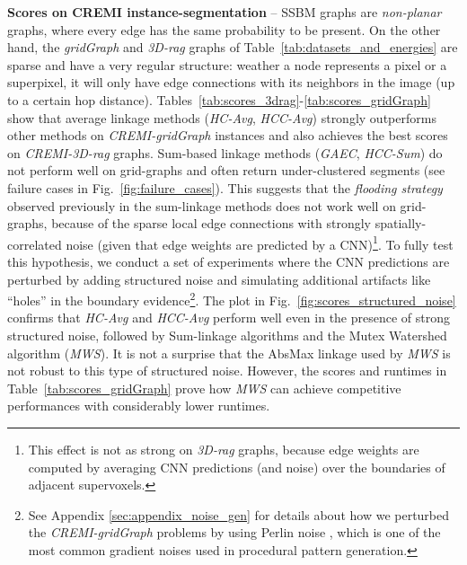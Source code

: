 \textbf{Scores on CREMI instance-segmentation} -- 
SSBM graphs are \emph{non-planar} graphs, where every edge has the same probability to be present. On the other hand, the \emph{gridGraph} and \emph{3D-rag} graphs of Table~\ref{tab:datasets_and_energies} are sparse and have a very regular structure: weather a node represents a pixel or a superpixel, it will only have edge connections with its neighbors in the image (up to a certain hop distance). 
Tables~\ref{tab:scores_3drag}-\ref{tab:scores_gridGraph} show that average linkage methods (\emph{HC-Avg}, \emph{HCC-Avg}) strongly outperforms other methods on \emph{CREMI-gridGraph} instances and also achieves the best scores on \emph{CREMI-3D-rag} graphs. Sum-based linkage methods (\emph{GAEC}, \emph{HCC-Sum}) do not perform well on grid-graphs and often return under-clustered segments (see failure cases in Fig.~\ref{fig:failure_cases}). This suggests that the \emph{flooding strategy} observed previously in the sum-linkage methods does not work well on grid-graphs, because of the sparse local edge connections with strongly spatially-correlated noise (given that edge weights are predicted by a CNN)\footnote{This effect is not as strong on \emph{3D-rag} graphs, because edge weights are computed by averaging CNN predictions (and noise) over the boundaries of adjacent supervoxels.}.
To fully test this hypothesis, we conduct a set of experiments where the CNN predictions are perturbed by adding structured noise and simulating additional artifacts like ``holes'' in the boundary evidence\footnote{See Appendix \ref{sec:appendix_noise_gen} for details about how we perturbed the \emph{CREMI-gridGraph} problems by using Perlin noise \cite{perlin2001noise,perlin1985image}, which is one of the most common gradient noises used in procedural pattern generation.}. 
The plot in Fig.~\ref{fig:scores_structured_noise} confirms that \emph{HC-Avg} and \emph{HCC-Avg} perform well even in the presence of strong structured noise, followed by Sum-linkage algorithms and the Mutex Watershed algorithm (\emph{MWS}). It is not a surprise that the AbsMax linkage used by \emph{MWS} is not robust to this type of structured noise. However, the scores and runtimes in Table~\ref{tab:scores_gridGraph} prove how \emph{MWS} can achieve competitive performances with considerably lower runtimes. 


